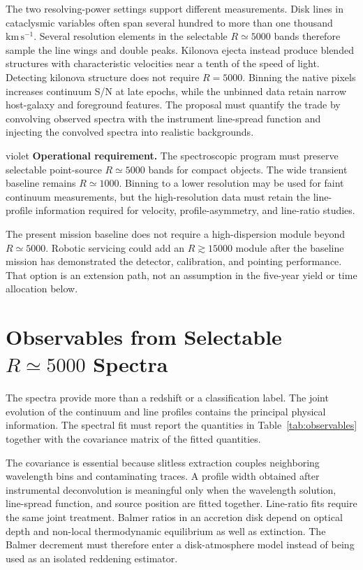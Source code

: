 \documentclass[10pt,onecolumn]{article}
\newcommand{\kms}{\mathrm{km\,s^{-1}}}
\begin{document}
The two resolving-power settings support different measurements. Disk lines
in cataclysmic variables often span several hundred to more than one thousand
$\kms$. Several resolution elements in the selectable $R\simeq5000$ bands
therefore sample the line wings and double peaks. Kilonova ejecta instead
produce blended structures with characteristic velocities near a tenth of the
speed of light. Detecting kilonova structure does not require $R=5000$.
Binning the native pixels increases continuum S/N at late epochs, while the
unbinned data retain narrow host-galaxy and foreground features. The proposal
must quantify the trade by convolving observed spectra with the instrument
line-spread function and injecting the convolved spectra into realistic
backgrounds.

\begin{xresultbox}{violet}
\textbf{Operational requirement.}
The spectroscopic program must preserve selectable point-source $R\simeq5000$
bands for compact objects. The wide transient baseline remains $R\simeq1000$.
Binning to a lower resolution may be used for faint continuum measurements,
but the high-resolution data must retain the line-profile information required
for velocity, profile-asymmetry, and line-ratio studies.
\end{xresultbox}

The present mission baseline does not require a high-dispersion module beyond
$R\simeq5000$. Robotic servicing could add an $R\gtrsim15000$ module after the
baseline mission has demonstrated the detector, calibration, and pointing
performance. That option is an extension path, not an assumption in the
five-year yield or time allocation below.

\section{Observables from Selectable \texorpdfstring{$R\simeq5000$}{R approximately 5000} Spectra}

The spectra provide more than a redshift or a classification label. The joint
evolution of the continuum and line profiles contains the principal physical
information. The spectral fit must report the quantities in
Table~\ref{tab:observables} together with the covariance matrix of the fitted
quantities.

The covariance is essential because slitless extraction couples neighboring
wavelength bins and contaminating traces. A profile width obtained after
instrumental deconvolution is meaningful only when the wavelength solution,
line-spread function, and source position are fitted together. Line-ratio fits
require the same joint treatment. Balmer ratios in an accretion disk depend on
optical
depth and non-local thermodynamic equilibrium as well as extinction. The
Balmer decrement must therefore enter a disk-atmosphere model instead of being
used as an isolated reddening estimator.
\end{document}
